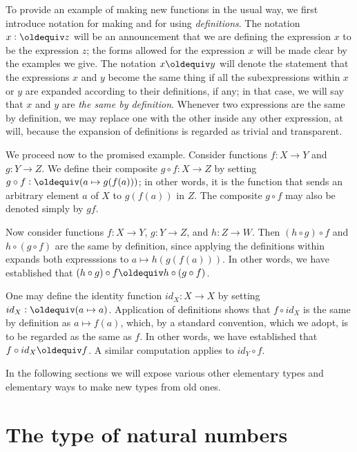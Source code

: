 To provide an example of making new functions in the usual way, we first introduce notation for making and for using {\em definitions}.  The
notation $x \defeq z$ will be an announcement that we are defining the expression $x$ to be the expression $z$; the forms allowed for the
expression $x$ will be made clear by the examples we give.  The notation $x \jdeq y$ will denote the statement that the expressions $x$ and $y$
become the same thing if all the subexpressions within $x$ or $y$ are expanded according to their definitions, if any; in that case, we will say
that $x$ and $y$ are \emph{the same by definition}.  Whenever two expressions are the same by definition, we may replace one with the other
inside any other expression, at will, because the expansion of definitions is regarded as trivial and transparent.

We proceed now to the promised example.  Consider functions $f : X \to Y$ and $g : Y \to Z$.  We define their composite $g \circ f : X \to Z$ by
setting $g \circ f \defeq (a \mapsto g(f(a)))$; in other words, it is the function that sends an arbitrary element $a$ of $X$ to $g(f(a))$ in
$Z$.  The composite $g \circ f$ may also be denoted simply by $gf$.

Now consider functions $f : X \to Y$, $g : Y \to Z$, and $h : Z \to W$.  Then $(h \circ g) \circ f$ and $h \circ (g \circ f)$ are the same by
definition, since applying the definitions within expands both expresssions to $a \mapsto h(g(f(a)))$.  In other
words, we have established that $(h \circ g) \circ f \jdeq h \circ (g \circ f)$.

One may define the identity function $id_X : X \to X$ by setting $id_X \defeq (a \mapsto a)$.  Application of definitions shows that $f \circ
id_X$ is the same by definition as $a \mapsto f(a)$, which, by a standard convention, which we adopt, is to be regarded as the same as $f$.  In
other words, we have established that $f \circ id_X \jdeq f$.  A similar computation applies to $id_Y \circ f$.

In the following sections we will expose various other elementary types and elementary ways to make new types from old ones.

\section{The type of natural numbers}
\label{sec:natural-numbers}

